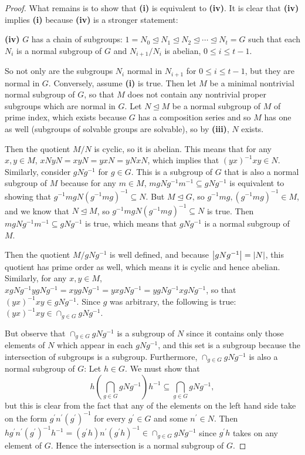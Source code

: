 \documentclass[11pt]{article}
\newcommand{\br}[1]{\left(#1\right)}
\begin{document}
\begin{enumerate}
\begin{proof}
      What remains is to show that \textbf{(i)} is equivalent to \textbf{(iv)}. It is clear that \textbf{(iv)} implies \textbf{(i)} because \textbf{(iv)} is a stronger statement:

      \textbf{(iv)} $G$ has a chain of subgroups: $1 = N_0 \unlhd N_1 \unlhd N_2 \unlhd \cdots \unlhd N_t = G$ such that each $N_i$ is a normal subgroup of $G$ and $N_{i+1}/N_i$ is abelian, $0\leq i\leq t-1$.

      So not only are the subgroups $N_i$ normal in $N_{i+1}$ for $0\leq i\leq t-1$, but they are normal in $G$. Conversely, assume \textbf{(i)} is true. Then let $M$ be a minimal nontrivial normal subgroup of $G$, so that $M$ does not contain any nontrivial proper subgroups which are normal in $G$. Let $N\unlhd M$ be a normal subgroup of $M$ of prime index, which exists because $G$ has a composition series and so $M$ has one as well (subgroups of solvable groups are solvable), so by \textbf{(iii)}, $N$ exists. 
      
      Then the quotient $M/N$ is cyclic, so it is abelian. This means that for any $x,y\in M$, $xNyN = xyN = yxN = yNxN$, which implies that $(yx)^{-1}xy \in N$. Similarly, consider $gNg^{-1}$ for $g\in G$. This is a subgroup of $G$ that is also a normal subgroup of $M$ because for any $m\in M$, $mgNg^{-1}m^{-1}\subseteq gNg^{-1}$ is equivalent to showing that $g^{-1}mgN(g^{-1}mg)^{-1} \subseteq N$. But $M\unlhd G$, so $g^{-1}mg, (g^{-1}mg)^{-1} \in M$, and we know that $N\unlhd M$, so $g^{-1}mgN(g^{-1}mg)^{-1} \subseteq N$ is true. Then $mgNg^{-1}m^{-1}\subseteq gNg^{-1}$ is true, which means that $gNg^{-1}$ is a normal subgroup of $M$.

      Then the quotient $M/gNg^{-1}$ is well defined, and because $\abs{gNg^{-1}} = \abs{N}$, this quotient has prime order as well, which means it is cyclic and hence abelian. Similarly, for any $x,y\in M$, $xgNg^{-1}ygNg^{-1} = xygNg^{-1} = yxgNg^{-1} = ygNg^{-1}xgNg^{-1}$, so that $(yx)^{-1}xy \in gNg^{-1}$. Since $g$ was arbitrary, the following is true: $(yx)^{-1}xy\in \cap_{g\in G} gNg^{-1}$. 
      
      But observe that $\cap_{g\in G} gNg^{-1}$ is a subgroup of $N$ since it contains only those elements of $N$ which appear in each $gNg^{-1}$, and this set is a subgroup because the intersection of subgroups is a subgroup. Furthermore, $\cap_{g\in G} gNg^{-1}$ is also a normal subgroup of $G$: Let $h\in G$. We must show that \[h\br{\bigcap_{g\in G} gNg^{-1}}h^{-1} \subseteq \bigcap_{g\in G} gNg^{-1},\] but this is clear from the fact that any of the elements on the left hand side take on the form $g^{\prime}n^{\prime}(g^{\prime})^{-1}$ for every $g^{\prime}\in G$ and some $n^{\prime}\in N$. Then $hg^{\prime}n^{\prime}(g^{\prime})^{-1}h^{-1} = (g^{\prime}h)n^{\prime}(g^{\prime}h)^{-1} \in \cap_{g\in G} gNg^{-1}$ since $g^{\prime}h$ takes on any element of $G$. Hence the intersection is a normal subgroup of $G$.


\end{proof}
\end{enumerate}
\end{document}

